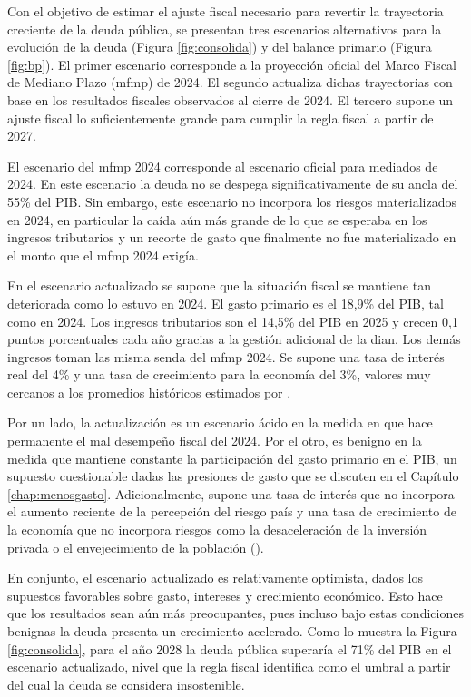 Con el objetivo de estimar el ajuste fiscal necesario para revertir la trayectoria creciente de la deuda pública, se presentan tres escenarios alternativos para la evolución de la deuda (Figura \ref{fig:consolida}) y del balance primario (Figura \ref{fig:bp}). El primer escenario corresponde a la proyección oficial del Marco Fiscal de Mediano Plazo (\gls{mfmp}) de 2024. El segundo actualiza dichas trayectorias con base en los resultados fiscales observados al cierre de 2024. El tercero supone un ajuste fiscal lo suficientemente grande para cumplir la regla fiscal a partir de 2027.

El escenario del \gls{mfmp} 2024 corresponde al escenario oficial para mediados de 2024. En este escenario la deuda no se despega significativamente de su ancla del 55\% del PIB. Sin embargo, este escenario no incorpora los riesgos materializados en 2024, en particular la caída aún más grande de lo que se esperaba en los ingresos tributarios y un recorte de gasto que finalmente no fue materializado en el monto que el \gls{mfmp} 2024 exigía.

En el escenario actualizado se supone que la situación fiscal se mantiene tan deteriorada como lo estuvo en 2024.  El gasto primario es el 18,9\% del PIB, tal como en 2024. Los ingresos tributarios son el 14,5\% del PIB en 2025 y crecen 0,1 puntos porcentuales cada año gracias a la gestión adicional de la \gls{dian}. Los demás ingresos toman las misma senda del \gls{mfmp} 2024. Se supone una tasa de interés real del 4\% y una tasa de crecimiento para la economía del 3\%, valores muy cercanos a los promedios históricos estimados por \textcite{zapata2022deuda}. 

Por un lado, la actualización es un escenario ácido en la medida en que hace permanente el mal desempeño fiscal del 2024. Por el otro, es benigno en la medida que mantiene constante la participación del gasto primario en el PIB, un supuesto cuestionable dadas las presiones de gasto que se discuten en el Capítulo \ref{chap:menosgasto}. Adicionalmente, supone una tasa de interés que no incorpora el aumento reciente de la percepción del riesgo país y una tasa de crecimiento de la economía que no incorpora riesgos como la desaceleración de la inversión privada o el envejecimiento de la población (\cite{Parra-Polanía2025}). 

En conjunto, el escenario actualizado es relativamente optimista, dados los supuestos favorables sobre gasto, intereses y crecimiento económico. Esto hace que los resultados sean aún más preocupantes, pues incluso bajo estas condiciones benignas la deuda presenta un crecimiento acelerado. Como lo muestra la Figura \ref{fig:consolida}, para el año 2028 la deuda pública superaría el 71\% del PIB en el escenario actualizado, nivel que la regla fiscal identifica como el umbral a partir del cual la deuda se considera insostenible.

